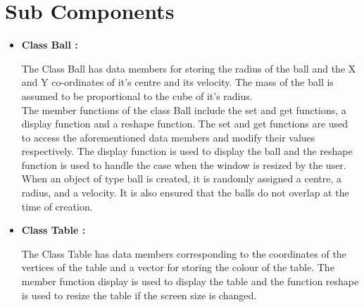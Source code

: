 \documentclass[]{article}
\begin{document}
\section{Sub Components}
\begin{itemize}
\item \textbf{Class Ball :}
\begin{flushleft}
The Class Ball has data members for storing the radius of the ball and the X and Y co-ordinates of it's centre and its velocity. The mass of the ball is assumed to be proportional to the cube of it's radius. 
\\
The member functions of the class Ball include the set and get functions, a display function and a reshape function. The set and get functions are used to access the aforementioned data members and modify their values respectively. The display function is used to display the ball and the reshape function is used to handle the case when the window is resized by the user.
\\ 
When an object of type ball is created, it is randomly assigned a centre, a radius, and a velocity. It is also ensured that the balls do not overlap at the time of creation.
\end{flushleft}

\item \textbf{Class Table :}
\begin{flushleft}
The Class Table has data members corresponding to the coordinates of the vertices of the table and a vector for storing the colour of the table. The member function display is used to display the table and the function reshape is used to resize the table if the screen size is changed.  
\end{flushleft}


\end{itemize}
\end{document}
